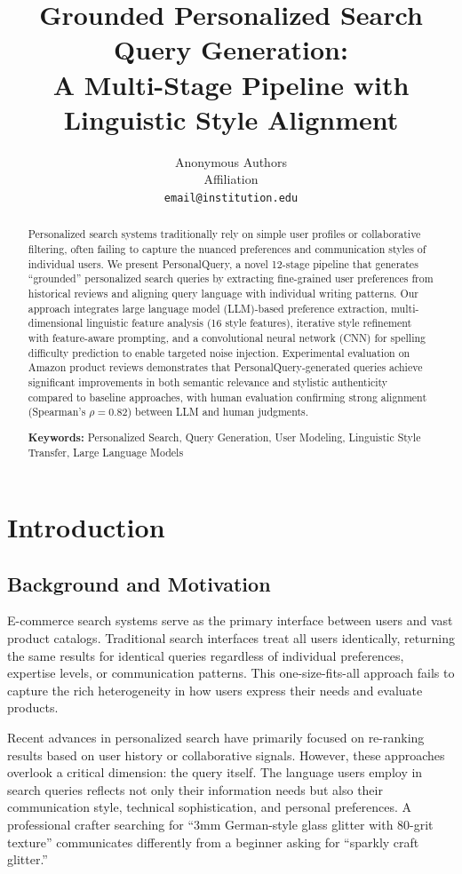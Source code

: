 \documentclass[11pt]{article}
\title{\textbf{Grounded Personalized Search Query Generation: \\A Multi-Stage Pipeline with Linguistic Style Alignment}}
\author{
Anonymous Authors \\
Affiliation \\
\texttt{email@institution.edu}
}
\newcommand{\method}{PersonalQuery}
\begin{document}
\maketitle

\begin{abstract}
Personalized search systems traditionally rely on simple user profiles or collaborative filtering, often failing to capture the nuanced preferences and communication styles of individual users. We present \method{}, a novel 12-stage pipeline that generates ``grounded'' personalized search queries by extracting fine-grained user preferences from historical reviews and aligning query language with individual writing patterns. Our approach integrates large language model (LLM)-based preference extraction, multi-dimensional linguistic feature analysis (16 style features), iterative style refinement with feature-aware prompting, and a convolutional neural network (CNN) for spelling difficulty prediction to enable targeted noise injection. Experimental evaluation on Amazon product reviews demonstrates that \method{}-generated queries achieve significant improvements in both semantic relevance and stylistic authenticity compared to baseline approaches, with human evaluation confirming strong alignment (Spearman's $\rho = 0.82$) between LLM and human judgments.

\textbf{Keywords:} Personalized Search, Query Generation, User Modeling, Linguistic Style Transfer, Large Language Models
\end{abstract}

\section{Introduction}

\subsection{Background and Motivation}

E-commerce search systems serve as the primary interface between users and vast product catalogs. Traditional search interfaces treat all users identically, returning the same results for identical queries regardless of individual preferences, expertise levels, or communication patterns. This one-size-fits-all approach fails to capture the rich heterogeneity in how users express their needs and evaluate products.

Recent advances in personalized search have primarily focused on re-ranking results based on user history or collaborative signals. However, these approaches overlook a critical dimension: the query itself. The language users employ in search queries reflects not only their information needs but also their communication style, technical sophistication, and personal preferences. A professional crafter searching for ``3mm German-style glass glitter with 80-grit texture'' communicates differently from a beginner asking for ``sparkly craft glitter.''
\end{document}
